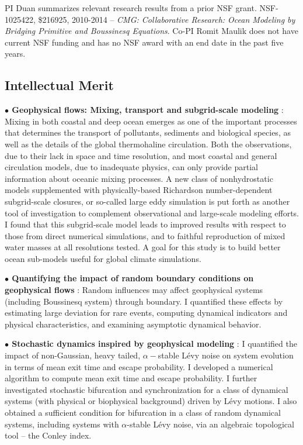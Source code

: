 \documentclass[11pt]{article}
\renewcommand{\a}{\alpha}
\begin{document}
  PI Duan summarizes relevant research results from  a   prior NSF grant.  NSF-1025422, \$216925, 2010-2014 -- \emph{CMG: Collaborative Research: Ocean Modeling by Bridging Primitive and Boussinesq Equations}.  Co-PI  Romit Maulik  does not have current NSF funding and has no NSF  award with an end date in the past five years.

\subsection*{Intellectual Merit}

\hspace{0.5cm} {\bf  $\bullet$ Geophysical flows: Mixing, transport  and subgrid-scale modeling } \cite{DuanAML2010}:
Mixing in both coastal and deep ocean emerges as one of the
important processes that determines the transport of pollutants,
sediments and biological species, as well as the details of the
global thermohaline circulation. Both the observations, due to
their lack in space and time resolution, and most coastal and
general circulation models, due to inadequate physics, can only
provide partial information about oceanic mixing processes. A new
class of nonhydrostatic models supplemented with physically-based
Richardson number-dependent  subgrid-scale   closures, or
so-called large eddy simulation is put forth as another tool of
investigation to complement observational and large-scale modeling
efforts. I  found that this subgrid-scale model leads to improved
results with respect to those from direct numerical simulations,
and  to   faithful reproduction of mixed water masses at all
resolutions tested. A goal for this study is to build better ocean
sub-models  useful for global  climate simulations.

\medskip

{\bf  $\bullet$  Quantifying the impact  of random boundary conditions on geophysical flows}
\cite{CSun,SXu-JDuan}:
Random influences may affect geophysical systems (including Boussinesq system) through boundary.  I  quantified these effects by estimating large deviation for rare events, computing dynamical indicators and physical characteristics, and examining asymptotic dynamical behavior.



\medskip

{\bf  $\bullet$ Stochastic dynamics inspired by geophysical  modeling} \cite{YongXuDuan, YongXu,  HaoDuan2, RenDuan2,   LiuDuan1,   Qiao, Qiao2, Qiao3, GaoTing2014, SunDuan3, ChenDuanFu}:
I       quantified  the impact of non-Gaussian, heavy tailed, $\a-$stable L\'evy noise on system evolution in terms of mean exit time and escape probability. I     developed a numerical algorithm to compute mean exit time and escape probability.
I   further investigated stochastic bifurcation and synchronization for a class of dynamical systems (with physical or biophysical background) driven by L\'evy motions.
I   also obtained a sufficient condition for  bifurcation in a class of  random dynamical systems, including systems with $\alpha$-stable L\'evy noise, via an algebraic topological tool -- the Conley index.
\end{document}
